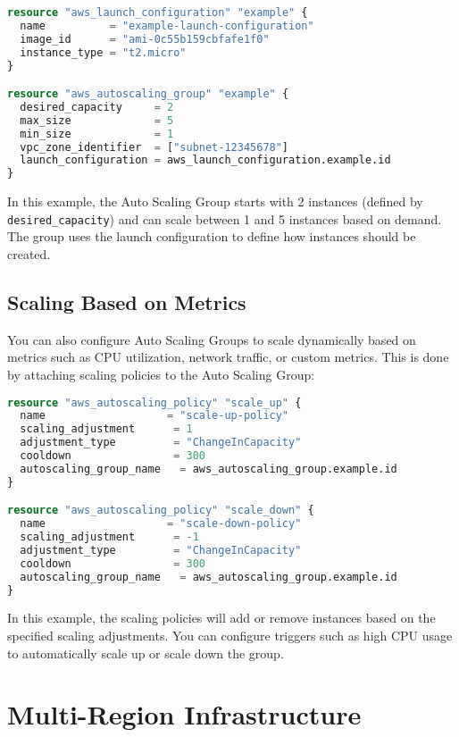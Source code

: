 \begin{lstlisting}[language=terraform]
resource "aws_launch_configuration" "example" {
  name          = "example-launch-configuration"
  image_id      = "ami-0c55b159cbfafe1f0"
  instance_type = "t2.micro"
}

resource "aws_autoscaling_group" "example" {
  desired_capacity     = 2
  max_size             = 5
  min_size             = 1
  vpc_zone_identifier  = ["subnet-12345678"]
  launch_configuration = aws_launch_configuration.example.id
}
\end{lstlisting}

In this example, the Auto Scaling Group starts with 2 instances (defined by \texttt{desired\_capacity}) and can scale between 1 and 5 instances based on demand. The group uses the launch configuration to define how instances should be created.

\subsection{Scaling Based on Metrics}

You can also configure Auto Scaling Groups to scale dynamically based on metrics such as CPU utilization, network traffic, or custom metrics. This is done by attaching scaling policies to the Auto Scaling Group:

\begin{lstlisting}[language=terraform]
resource "aws_autoscaling_policy" "scale_up" {
  name                   = "scale-up-policy"
  scaling_adjustment      = 1
  adjustment_type         = "ChangeInCapacity"
  cooldown                = 300
  autoscaling_group_name   = aws_autoscaling_group.example.id
}

resource "aws_autoscaling_policy" "scale_down" {
  name                   = "scale-down-policy"
  scaling_adjustment      = -1
  adjustment_type         = "ChangeInCapacity"
  cooldown                = 300
  autoscaling_group_name   = aws_autoscaling_group.example.id
}
\end{lstlisting}

In this example, the scaling policies will add or remove instances based on the specified scaling adjustments. You can configure triggers such as high CPU usage to automatically scale up or scale down the group.

\section{Multi-Region Infrastructure}

